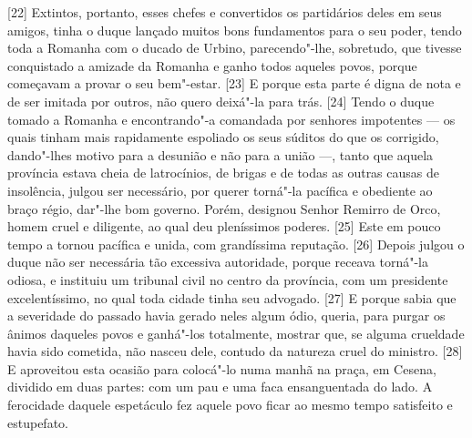 {[}22{]} Extintos, portanto, esses chefes e convertidos os partidários
deles em seus amigos, tinha o duque lançado muitos bons fundamentos para
o seu poder, tendo toda a Romanha com o ducado de Urbino, parecendo"-lhe,
sobretudo, que tivesse conquistado a amizade da Romanha e ganho todos
aqueles povos, porque começavam a provar o seu bem"-estar. {[}23{]} E
porque esta parte é digna de nota e de ser imitada por outros, não quero
deixá"-la para trás. {[}24{]} Tendo o duque tomado a Romanha e
encontrando"-a comandada por senhores impotentes --- os quais tinham mais
rapidamente espoliado os seus súditos do que os corrigido, dando"-lhes
motivo para a desunião e não para a união ---, tanto que aquela província
estava cheia de latrocínios, de brigas e de todas as outras causas de
insolência, julgou ser necessário, por querer torná"-la pacífica e
obediente ao braço régio, dar"-lhe bom governo. Porém, designou
Senhor Remirro de Orco, homem cruel e
diligente, ao qual deu pleníssimos poderes. {[}25{]} Este em pouco tempo
a tornou pacífica e unida, com grandíssima reputação. {[}26{]} Depois
julgou o duque não ser necessária tão excessiva autoridade, porque
receava torná"-la odiosa, e instituiu um tribunal civil no centro da
província, com um presidente excelentíssimo, no qual toda cidade tinha
seu advogado. {[}27{]} E porque sabia que a severidade do passado havia
gerado neles algum ódio, queria, para purgar os ânimos daqueles povos e
ganhá"-los totalmente, mostrar que, se alguma crueldade havia sido
cometida, não nasceu dele, contudo da natureza cruel do ministro.
{[}28{]} E aproveitou esta ocasião para colocá"-lo numa manhã na praça,
em Cesena, dividido em duas partes: com um pau e uma faca ensanguentada
do lado. A ferocidade daquele espetáculo fez aquele povo ficar ao mesmo
tempo satisfeito e estupefato.

